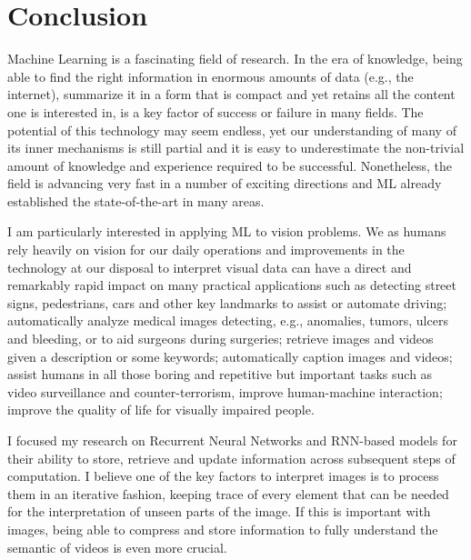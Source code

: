 \chapter{Conclusion}\label{sec:conclusion}

Machine Learning is a fascinating field of research. In the era of knowledge,
being able to find the right information in enormous amounts of data (e.g., the
internet), summarize it in a form that is compact and yet retains all the
content one is interested in, is a key factor of success or failure in many
fields. The potential of this technology may seem endless, yet our
understanding of many of its inner mechanisms is still partial and it is easy
to underestimate the non-trivial amount of knowledge and experience required to
be successful.  Nonetheless, the field is advancing very fast in a number of
exciting directions and ML already established the state-of-the-art in many
areas.

I am particularly interested in applying ML to vision problems. We as humans
rely heavily on vision for our daily operations and improvements in the
technology at our disposal to interpret visual data can have a direct and
remarkably rapid impact on many practical applications such as detecting
street signs, pedestrians, cars and other key landmarks to assist or automate
driving; automatically analyze medical images detecting, e.g., anomalies,
tumors, ulcers and bleeding, or to aid surgeons during surgeries; retrieve
images and videos given a description or some keywords; automatically caption
images and videos; assist humans in all those boring and repetitive but
important tasks such as video surveillance and counter-terrorism, improve
human-machine interaction; improve the quality of life for visually impaired
people.

I focused my research on Recurrent Neural Networks and RNN-based models for
their ability to store, retrieve and update information across subsequent steps
of computation. I believe one of the key factors to interpret images is to
process them in an iterative fashion, keeping trace of every element that can
be needed for the interpretation of unseen parts of the image. If this is
important with images, being able to compress and store information to
fully understand the semantic of videos is even more crucial.

